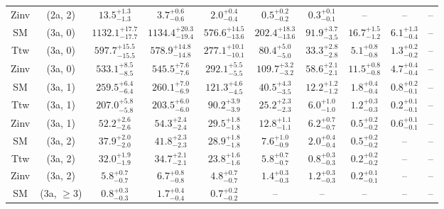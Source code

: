 \begin{table}[h!]
{\begin{tabular}{cccccccccc}
	Zinv & (2a, 2) & $13.5^{+ 1.3 }_{- 1.3 }$ & $3.7^{+ 0.6 }_{- 0.6 }$ & $2.0^{+ 0.4 }_{- 0.4 }$ & $0.5^{+ 0.2 }_{- 0.2 }$ & $0.3^{+ 0.1 }_{- 0.1 }$ & -- & -- & -- \\[0.5ex] 
	SM & (3a, 0) & $1132.1^{+ 17.7 }_{- 17.7 }$ & $1134.4^{+ 20.3 }_{- 19.4 }$ & $576.6^{+ 14.5 }_{- 13.6 }$ & $202.4^{+ 18.3 }_{- 13.6 }$ & $91.9^{+ 3.7 }_{- 3.5 }$ & $16.7^{+ 1.5 }_{- 1.2 }$ & $6.1^{+ 1.3 }_{- 0.4 }$ & -- \\[0.5ex] 
	Ttw & (3a, 0) & $597.7^{+ 15.5 }_{- 15.5 }$ & $578.9^{+ 14.8 }_{- 14.8 }$ & $277.1^{+ 10.1 }_{- 10.1 }$ & $80.4^{+ 5.0 }_{- 5.0 }$ & $33.3^{+ 2.8 }_{- 2.8 }$ & $5.1^{+ 0.8 }_{- 0.8 }$ & $1.3^{+ 0.2 }_{- 0.2 }$ & -- \\[0.5ex] 
	Zinv & (3a, 0) & $533.1^{+ 8.5 }_{- 8.5 }$ & $545.5^{+ 7.6 }_{- 7.6 }$ & $292.1^{+ 5.5 }_{- 5.5 }$ & $109.7^{+ 3.2 }_{- 3.2 }$ & $58.6^{+ 2.1 }_{- 2.1 }$ & $11.5^{+ 0.8 }_{- 0.8 }$ & $4.7^{+ 0.4 }_{- 0.4 }$ & -- \\[0.5ex] 
	SM & (3a, 1) & $259.5^{+ 6.4 }_{- 6.4 }$ & $260.1^{+ 7.0 }_{- 6.9 }$ & $121.3^{+ 4.6 }_{- 4.5 }$ & $40.5^{+ 4.3 }_{- 3.5 }$ & $12.2^{+ 1.2 }_{- 1.2 }$ & $1.8^{+ 0.4 }_{- 0.4 }$ & $0.8^{+ 0.2 }_{- 0.1 }$ & -- \\[0.5ex] 
	Ttw & (3a, 1) & $207.0^{+ 5.8 }_{- 5.8 }$ & $203.5^{+ 6.0 }_{- 6.0 }$ & $90.2^{+ 3.9 }_{- 3.9 }$ & $25.2^{+ 2.3 }_{- 2.3 }$ & $6.0^{+ 1.0 }_{- 1.0 }$ & $1.2^{+ 0.3 }_{- 0.3 }$ & $0.2^{+ 0.1 }_{- 0.1 }$ & -- \\[0.5ex] 
	Zinv & (3a, 1) & $52.2^{+ 2.6 }_{- 2.6 }$ & $54.3^{+ 2.4 }_{- 2.4 }$ & $29.5^{+ 1.8 }_{- 1.8 }$ & $12.8^{+ 1.1 }_{- 1.1 }$ & $6.2^{+ 0.7 }_{- 0.7 }$ & $0.5^{+ 0.2 }_{- 0.2 }$ & $0.6^{+ 0.1 }_{- 0.1 }$ & -- \\[0.5ex] 
	SM & (3a, 2) & $37.9^{+ 2.0 }_{- 2.0 }$ & $41.8^{+ 2.3 }_{- 2.3 }$ & $28.9^{+ 1.8 }_{- 1.8 }$ & $7.6^{+ 1.0 }_{- 0.9 }$ & $2.0^{+ 0.4 }_{- 0.4 }$ & $0.5^{+ 0.2 }_{- 0.2 }$ & -- & -- \\[0.5ex] 
	Ttw & (3a, 2) & $32.0^{+ 1.9 }_{- 1.9 }$ & $34.7^{+ 2.1 }_{- 2.1 }$ & $23.8^{+ 1.6 }_{- 1.6 }$ & $5.8^{+ 0.7 }_{- 0.7 }$ & $0.8^{+ 0.3 }_{- 0.3 }$ & $0.2^{+ 0.2 }_{- 0.2 }$ & -- & -- \\[0.5ex] 
	Zinv & (3a, 2) & $5.8^{+ 0.7 }_{- 0.7 }$ & $6.7^{+ 0.8 }_{- 0.8 }$ & $4.8^{+ 0.7 }_{- 0.7 }$ & $1.4^{+ 0.3 }_{- 0.3 }$ & $1.2^{+ 0.3 }_{- 0.3 }$ & $0.2^{+ 0.1 }_{- 0.1 }$ & -- & -- \\[0.5ex] 
	SM & (3a, $\ge3$) & $0.8^{+ 0.3 }_{- 0.3 }$ & $1.7^{+ 0.4 }_{- 0.4 }$ & $0.7^{+ 0.2 }_{- 0.2 }$ & -- & -- & -- & -- & -- \\[0.5ex] 

\end{tabular}}
\end{table}
